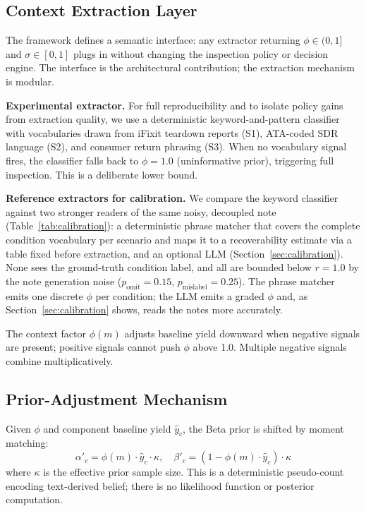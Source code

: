\documentclass[conference]{IEEEtran}
\begin{document}
\subsection{Context Extraction Layer}

The framework defines a semantic interface: any extractor returning
$\phi\in(0,1]$ and $\sigma\in[0,1]$ plugs in without changing the inspection
policy or decision engine. The interface is the architectural contribution;
the extraction mechanism is modular.

\smallskip\noindent\textbf{Experimental extractor.}
For full reproducibility and to isolate policy gains from extraction quality,
we use a deterministic keyword-and-pattern classifier with vocabularies drawn
from iFixit teardown reports (S1), ATA-coded SDR language (S2), and consumer
return phrasing (S3). When no vocabulary signal fires, the classifier falls back
to $\phi{=}1.0$ (uninformative prior), triggering full inspection. This is a
deliberate lower bound.

\smallskip\noindent\textbf{Reference extractors for calibration.}
We compare the keyword classifier against two stronger readers of the same noisy,
decoupled note (Table~\ref{tab:calibration}): a deterministic phrase matcher that
covers the complete condition vocabulary per scenario and maps it to a
recoverability estimate via a table fixed before extraction, and an optional LLM
(Section~\ref{sec:calibration}). None sees the ground-truth condition label, and
all are bounded below $r{=}1.0$ by the note generation noise
($p_\text{omit}{=}0.15$, $p_\text{mislabel}{=}0.25$). The phrase matcher emits one
discrete $\phi$ per condition; the LLM emits a graded $\phi$ and, as
Section~\ref{sec:calibration} shows, reads the notes more accurately.

The context factor $\phi(m)$ adjusts baseline yield downward when negative
signals are present; positive signals cannot push $\phi$ above 1.0. Multiple
negative signals combine multiplicatively.

\subsection{Prior-Adjustment Mechanism}\label{sec:prior}

Given $\phi$ and component baseline yield $\hat{y}_c$, the Beta prior is
shifted by moment matching:
\begin{equation}
\alpha'_c = \phi(m)\cdot\hat{y}_c\cdot\kappa,\quad
\beta'_c  = (1-\phi(m)\cdot\hat{y}_c)\cdot\kappa
\label{eq:prior}
\end{equation}
where $\kappa$ is the effective prior sample size. This is a deterministic
pseudo-count encoding text-derived belief; there is no likelihood function or
posterior computation.
\end{document}
